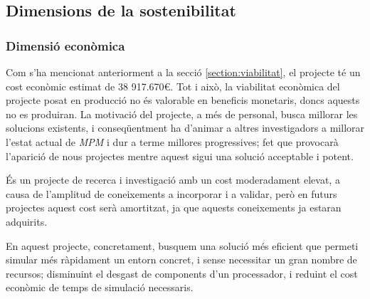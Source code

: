 \documentclass[a4paper]{report}
\begin{document}
	\subsection{Dimensions de la sostenibilitat}
	\subsubsection{Dimensió econòmica}
	Com s'ha mencionat anteriorment a la secció \ref{section:viabilitat}, el projecte té un cost econòmic estimat de 38 917.670\euro. Tot i això, la viabilitat econòmica del projecte posat en producció no és valorable en beneficis monetaris, doncs aquests no es produiran. La motivació del projecte, a més de personal, busca millorar les solucions existents, i conseqüentment ha d'animar a altres investigadors a millorar l'estat actual de \textit{MPM} i dur a terme millores progressives; fet que provocarà l'aparició de nous projectes mentre aquest sigui una solució acceptable i potent. \par
	És un projecte de recerca i investigació amb un cost moderadament elevat, a causa de l'amplitud de coneixements a incorporar i a validar, però en futurs projectes aquest cost serà amortitzat, ja que aquests coneixements ja estaran adquirits. \par
	En aquest projecte, concretament, busquem una solució més eficient que permeti simular més ràpidament un entorn concret, i sense necessitar un gran nombre de recursos; disminuint el desgast de components d'un processador, i reduint el cost econòmic de temps de simulació necessaris.
	
\end{document}

